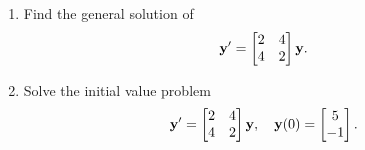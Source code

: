 \documentclass{ximera}
\begin{document}
\begin{example}\label{example:10.4.1}

\begin{enumerate}
\item\label{item:10.4.1a} %
 Find the general solution of
\begin{equation}\label{eq:10.4.8}
{\bf y}'=\begin{bmatrix}2&4\\4&2\end{bmatrix}
{\bf y}.
\end{equation}

\item\label{item:10.4.1b} %
 Solve the initial value problem
\begin{equation}\label{eq:10.4.9}
{\bf y}'=\begin{bmatrix}2&4\\4&2\end{bmatrix}
{\bf y},\quad{\bf y}(0)=\begin{bmatrix}5 \\-1
\end{bmatrix}.
\end{equation}
\end{enumerate}


\end{example}
\end{document}
